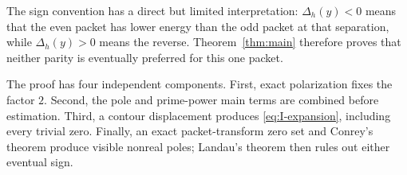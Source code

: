 The sign convention has a direct but limited interpretation:
\(\Delta_h(y)<0\) means that the even packet has lower energy than the odd
packet at that separation, while \(\Delta_h(y)>0\) means the reverse.
Theorem~\ref{thm:main} therefore proves that neither parity is eventually
preferred for this one packet.

The proof has four independent components.  First, exact polarization fixes
the factor \(2\).  Second, the pole and prime-power main terms are combined
before estimation.  Third, a contour displacement produces
\eqref{eq:I-expansion}, including every trivial zero.  Finally, an exact
packet-transform zero set and Conrey's theorem produce visible nonreal poles;
Landau's theorem then rules out either eventual sign.
